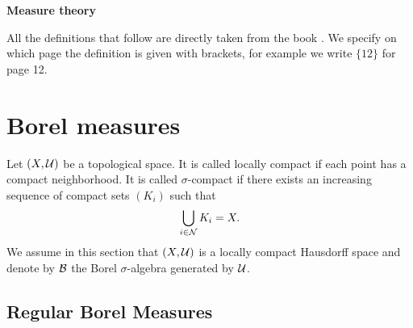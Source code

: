 \documentclass{article}
\begin{document}
\begin{center}
    \textbf{Measure theory}
\end{center}

All the definitions that follow are directly taken from the book \cite{salamon2020measure}. We specify on which page the definition is given with brackets, for example we write $\{12\}$ for page 12.


\section{Borel measures}

 Let $(X, \mathcal{U})$ be a topological space. It is called locally compact if each point has a compact neighborhood. It is called $\sigma$-compact if there exists an increasing sequence of compact sets $(K_i)$ such that
\begin{equation}
    \bigcup_{i \in \mathcal{N}} K_i = X.
\end{equation}
We assume in this section that $(X, \mathcal{U})$ is a locally compact Hausdorff space and denote by $\mathcal{B}$ the Borel $\sigma$-algebra generated by $\mathcal{U}$.

\subsection{Regular Borel Measures}
\end{document}
